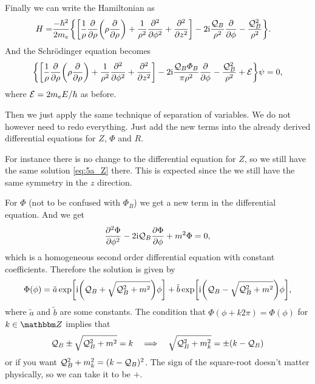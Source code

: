 \documentclass[11pt,letter, swedish, english
]{article}
\begin{document}
Finally we can write the Hamiltonian as
\begin{equation}
\begin{aligned}
H=&\frac{-\hbar^2}{2m_e}\qty{\qty[
\frac{1}{\rho}\pdv{\rho}\qty(\rho\pdv{\rho})
+\frac{1}{\rho^2}\pdv[2]{\phi} + \pdv[2]{z}]
-2\mathrm{i}\frac{\ensuremath{\mathcal{Q}_B}}{\rho^2}\pdv{\phi}
-\frac{\ensuremath{\mathcal{Q}_B}^2}{\rho^2} }.
\end{aligned}
\end{equation}
And the Schrödinger equation becomes
\begin{equation}
\qty{ \qty[
\frac{1}{\rho}\pdv{\rho}\qty(\rho\pdv{\rho})
+\frac{1}{\rho^2}\pdv[2]{\phi} + \pdv[2]{z}]
-2\mathrm{i}\frac{\ensuremath{\mathcal{Q}_B}\varPhi_B}{\pi\rho^2}\pdv{\phi}
-\frac{\ensuremath{\mathcal{Q}_B}^2}{\rho^2} +\ensuremath{\mathcal{E}}}\psi=0,
\end{equation}
where $\mathcal{E}=2m_eE/\hbar$ as before.

Then we just apply the same technique of separation of variables. We
do not however need to redo everything. Just add the new terms into
the already derived differential equations for $Z$, $\Phi$ and $R$.

For instance there is no
change to the differential equation for $Z$, so we still have the same
solution \eqref{eq:5a_Z} there. This is expected since the we still
have the same symmetry in the $z$ direction.

For $\Phi$ (not to be confused with $\varPhi_B$) we get a new term in
the differential equation. And we get
\begin{equation}
\pdv[2]{\Phi}{\phi} - 2\mathrm{i}\mathcal{Q}_B \pdv{\Phi}{\phi} + m^2\Phi =  0,
\end{equation}
which is a homogeneous second order differential equation with
constant coefficients. Therefore the solution is given by
\begin{equation}
\Phi(\phi)=\tilde{a}\exp[\mathrm{i}\qty(\mathcal{Q}_B+\sqrt{\mathcal{Q}_B^2+m^2})\phi]
+\tilde{b}\exp[\mathrm{i}\qty(\mathcal{Q}_B-\sqrt{\mathcal{Q}_B^2+m^2})\phi],
\end{equation}
where $\tilde{a}$ and $\tilde{b}$ are some constants.
The condition that $\Phi(\phi+k2\pi)=\Phi(\phi)$ for $k\in\Z$ implies
that
\begin{equation}\label{eq:5_mk}
\mathcal{Q}_B\pm\sqrt{\mathcal{Q}_B^2+m^2}=k
\quad\Longrightarrow\quad
\sqrt{\mathcal{Q}_B^2+m^2_k}=\pm(k-\mathcal{Q}_B)
\end{equation}
or if you want $\mathcal{Q}_B^2+m^2_k=(k-\mathcal{Q}_B)^2$. The sign of the square-root
doesn't matter physically, so we can take it to be $+$.
\end{document}
